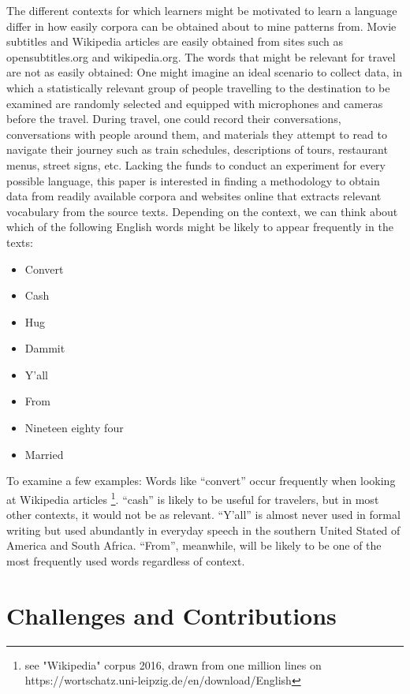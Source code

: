 The different contexts for which learners might be motivated to learn a language differ in how easily corpora can be obtained about to mine patterns from. Movie subtitles and Wikipedia articles are easily obtained from sites such as opensubtitles.org and wikipedia.org. The words that might be relevant for travel are not as easily obtained: One might imagine an ideal scenario to collect data, in which a statistically relevant group of people travelling to the destination to be examined are randomly selected and equipped with microphones and cameras before the travel. During travel, one could record their conversations, conversations with people around them, and materials they attempt to read to navigate their journey such as train schedules, descriptions of tours, restaurant menus, street signs, etc. Lacking the funds to conduct an experiment for every possible language, this paper is interested in finding a methodology to obtain data from readily available corpora and websites online that extracts relevant vocabulary from the source texts.
Depending on the context, we can think about which of the following English words might be likely to appear frequently in the texts:

\begin{itemize}
	\item Convert
	\item Cash
	\item Hug
	\item Dammit
	\item Y'all
	\item From
	\item Nineteen eighty four
	\item Married
\end{itemize}

To examine a few examples: Words like “convert” occur frequently when looking at Wikipedia articles \footnote{see "Wikipedia" corpus 2016, drawn from one million lines on https://wortschatz.uni-leipzig.de/en/download/English}. “cash” is likely to be useful for travelers, but in most other contexts, it would not be as relevant. “Y’all” is almost never used in formal writing but used abundantly in everyday speech in the southern United Stated of America and South Africa. “From”, meanwhile, will be likely to be one of the most frequently used words regardless of context.

\section{Challenges and Contributions}

